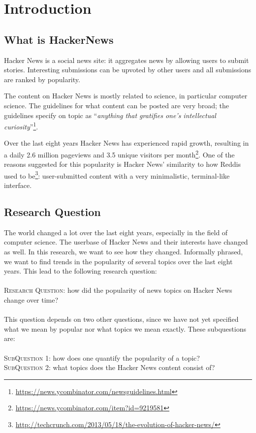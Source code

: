 \section{Introduction}
\subsection{What is HackerNews}
Hacker News is a social news site: it aggregates news by allowing users to submit stories. Interesting submissions can be upvoted by other users and all submissions are ranked by popularity.

The content on Hacker News is mostly related to science, in particular computer science. The guidelines for what content can be posted are very broad; the guidelines specify on topic as ``\textit{anything that gratifies one's intellectual curiosity}''\footnote{\url{https://news.ycombinator.com/newsguidelines.html}}.

Over the last eight years Hacker News has experienced rapid growth, resulting in a daily 2.6 million pageviews and 3.5 unique visitors per month\footnote{\url{https://news.ycombinator.com/item?id=9219581}}. One of the reasons suggested for this popularity is Hacker News' similarity to how Reddis used to be\footnote{\url{http://techcrunch.com/2013/05/18/the-evolution-of-hacker-news/}}: user-submitted content with a very minimalistic, terminal-like interface.

\subsection{Research Question}
The world changed a lot over the last eight years, especially in the field of computer science.  The userbase of Hacker News and their interests have changed as well. In this research, we want to see how they changed. Informally phrased, we want to find trends in the popularity of several topics over the last eight years. This lead to the following research question:\\
\\
\textsc{Research Question:} how did the popularity of news topics on Hacker News change over time?\\
\\
This question depends on two other questions, since we have not yet specified what we mean by popular nor what topics we mean exactly. These subquestions are:\\
\\
\textsc{SubQuestion 1:} how does one quantify the popularity of a topic?\\
\textsc{SubQuestion 2:} what topics does the Hacker News content consist of?\\


